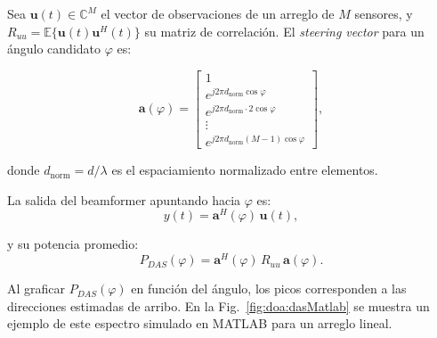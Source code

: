 Sea $\mathbf{u}(t) \in \mathbb{C}^M$ el vector de observaciones de un arreglo de $M$ sensores, 
y $R_{uu}=\mathbb{E}\{\mathbf{u}(t)\mathbf{u}^H(t)\}$ su matriz de correlación.  
El \emph{steering vector} para un ángulo candidato $\varphi$ es:

\begin{equation}
	\mathbf{a}(\varphi) =
	\begin{bmatrix}
		1 \\
		e^{j 2 \pi d_{\text{norm}} \cos \varphi} \\
		e^{j 2 \pi d_{\text{norm}} \cdot 2 \cos \varphi} \\
		\vdots \\
		e^{j 2 \pi d_{\text{norm}} (M-1)\cos \varphi}
	\end{bmatrix},
\end{equation}

donde $d_{\text{norm}} = d/\lambda$ es el espaciamiento normalizado entre elementos.  

La salida del beamformer apuntando hacia $\varphi$ es:
\begin{equation}
	y(t) = \mathbf{a}^H(\varphi)\, \mathbf{u}(t),
\end{equation}

y su potencia promedio:
\begin{equation}
	P_{DAS}(\varphi) = \mathbf{a}^H(\varphi)\, R_{uu}\, \mathbf{a}(\varphi).
\end{equation}

Al graficar $P_{DAS}(\varphi)$ en función del ángulo, los picos corresponden 
a las direcciones estimadas de arribo.  
En la Fig.~\ref{fig:doa:dasMatlab} se muestra un ejemplo de este espectro 
simulado en MATLAB para un arreglo lineal.

